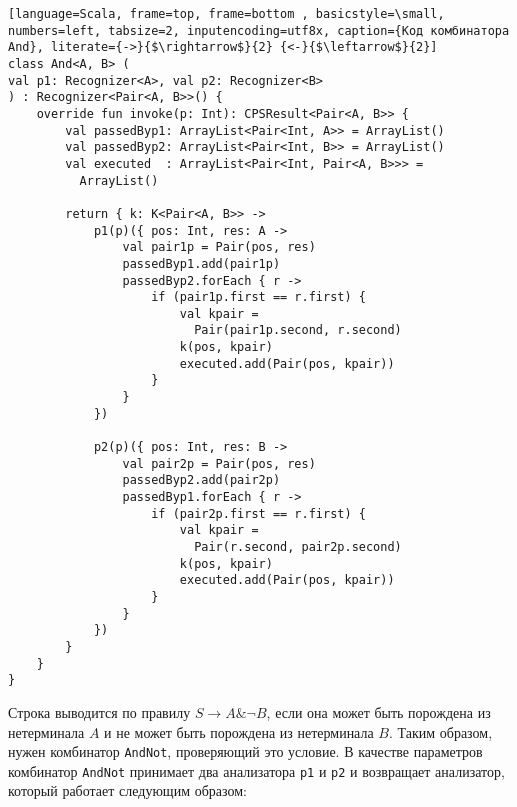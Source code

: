 \begin{lstlisting}[language=Scala, frame=top, frame=bottom , basicstyle=\small, numbers=left, tabsize=2, inputencoding=utf8x, caption={Код комбинатора And}, literate={->}{$\rightarrow$}{2} {<-}{$\leftarrow$}{2}]
class And<A, B> (
val p1: Recognizer<A>, val p2: Recognizer<B>
) : Recognizer<Pair<A, B>>() {
    override fun invoke(p: Int): CPSResult<Pair<A, B>> {
        val passedByp1: ArrayList<Pair<Int, A>> = ArrayList()
        val passedByp2: ArrayList<Pair<Int, B>> = ArrayList()
        val executed  : ArrayList<Pair<Int, Pair<A, B>>> =
          ArrayList()

        return { k: K<Pair<A, B>> ->
            p1(p)({ pos: Int, res: A ->
                val pair1p = Pair(pos, res)
                passedByp1.add(pair1p)
                passedByp2.forEach { r ->
                    if (pair1p.first == r.first) {
                        val kpair =
                          Pair(pair1p.second, r.second)
                        k(pos, kpair)
                        executed.add(Pair(pos, kpair))
                    }
                }
            })

            p2(p)({ pos: Int, res: B ->
                val pair2p = Pair(pos, res)
                passedByp2.add(pair2p)
                passedByp1.forEach { r ->
                    if (pair2p.first == r.first) {
                        val kpair =
                          Pair(r.second, pair2p.second)
                        k(pos, kpair)
                        executed.add(Pair(pos, kpair))
                    }
                }
            })
        }
    }
}
\end{lstlisting}
Строка выводится по правилу $S \rightarrow A \& \neg B$, если она может быть порождена из нетерминала $A$ и не может быть порождена из нетерминала $B$. Таким образом, нужен комбинатор \lstinline[language=Scala]{AndNot}, проверяющий это условие.
В качестве параметров комбинатор \lstinline[language=Scala]{AndNot} принимает два анализатора \lstinline[language=Scala]{p1} и \lstinline[language=Scala]{p2} и возвращает анализатор, который работает следующим образом:

